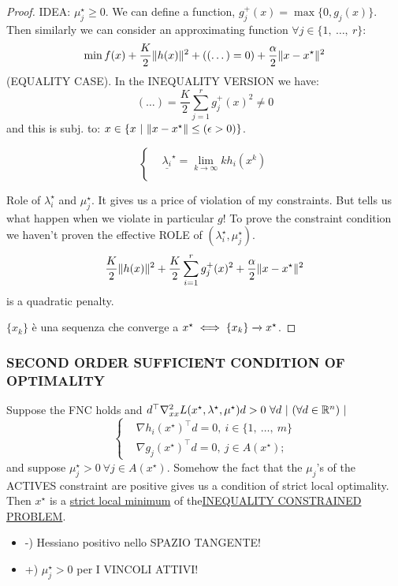 \begin{proof}
IDEA: $\mu_j^\star \geq 0$. We can define a function, $g_j^+(x) = \max{\{0,g_j(x)\}}$. Then similarly we can consider an approximating function $\forall j\in\{1,\ \dots,\ r\}$:
\[
	\min{f(x) + \frac{K}{2}\lVert h(x)\rVert^2 + ((\dots)= 0) + \frac{\alpha}{2}\lVert x-x^\star\rVert^2}
\]
(EQUALITY CASE). In the INEQUALITY VERSION we have:
\[
	(\dots) = \frac{K}{2}\sum_{j=1}^r{g_j^+(x)^2} \neq 0
\]
and this is subj. to: $x\in\{x\ |\ \norma{x-x^\star} \leq (\epsilon>0)\}$.

\[
	\left\{
	\begin{aligned}
	&\underline{\lambda_i}^\star = \lim_{k\to\infty}{kh_i(x^k)}\\
	\end{aligned}
	\right.
\]

Role of $\lambda_i^\star$ and $\mu_j^\star$. It gives us a price of violation of my constraints. But tells us what happen when we violate in particular $g$! To prove the constraint condition we haven't proven the effective ROLE of $(\lambda_i^\star,\mu_j^\star)$.
\[
	\frac{K}{2}\lVert h(x)\rVert^2 + \frac{K}{2}\sum_{i=1}^r{g_j^+(x)^2} + \frac{\alpha}{2}\lVert x-x^\star\rVert^2
\]
is a quadratic penalty.

$\{x_k\}$ è una sequenza che converge a $x^\star \iff \{x_k\} \tendsto{} x^\star$.

\end{proof}

\subsubsection{SECOND ORDER SUFFICIENT CONDITION OF OPTIMALITY}

Suppose the FNC holds and $d^\top \nabla_{xx}^2{L(x^\star,\lambda^\star,\mu^\star)}d > 0\ \forall d\ |\ (\forall d\in\R^n)\ |$
\[
	\left\{
	\begin{aligned}
	&\nabla{h_i(x^\star)}^\top d = 0,\ i\in\{1,\ \dots,\ m\}\\
	&\nabla{g_j(x^\star)}^\top d = 0,\ j\in A(x^\star);
	\end{aligned}
	\right.
\]
and suppose $\mu_j^\star > 0\ \forall j\in A(x^\star)$. Somehow the fact that the $\mu_j$'s of the ACTIVES constraint are positive gives us a condition of strict local optimality. Then $x^\star$ is a \underline{strict local minimum} of the\newline\underline{INEQUALITY CONSTRAINED PROBLEM}.

\begin{itemize}
\item{-)} Hessiano positivo nello SPAZIO TANGENTE!
\item{+)} $\mu_j^\star>0$ per I VINCOLI ATTIVI!
\end{itemize}

